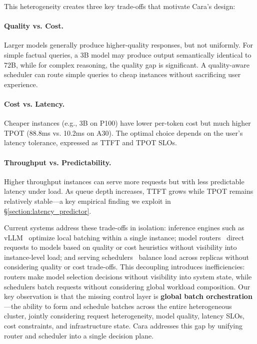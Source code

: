 \documentclass[letterpaper, anonymous, twocolumn, 10pt]{article}
\begin{document}
This heterogeneity creates three key trade-offs that motivate Cara's design:

\paragraph{Quality vs. Cost.}
Larger models generally produce higher-quality responses, but not uniformly.
For simple factual queries, a 3B model may produce output semantically identical to 72B, while for complex reasoning, the quality gap is significant.
A quality-aware scheduler can route simple queries to cheap instances without sacrificing user experience.

\paragraph{Cost vs. Latency.}
Cheaper instances (e.g., 3B on P100) have lower per-token cost but much higher TPOT (88.8ms vs. 10.2ms on A30).
The optimal choice depends on the user's latency tolerance, expressed as TTFT and TPOT SLOs.

\paragraph{Throughput vs. Predictability.}
Higher throughput instances can serve more requests but with less predictable latency under load.
As queue depth increases, TTFT grows while TPOT remains relatively stable---a key empirical finding we exploit in \S\ref{section:latency_predictor}.

Current systems address these trade-offs in isolation: inference engines such as vLLM~\cite{kwon2023vllm} optimize local batching within a single instance; model routers~\cite{Ong2024RouteLLMLT, universal_model_routering} direct requests to models based on quality or cost heuristics without visibility into instance-level load; and serving schedulers~\cite{da2025blockbalancingloadllm, qlm} balance load across replicas without considering quality or cost trade-offs.
This decoupling introduces inefficiencies: routers make model selection decisions without visibility into system state, while schedulers batch requests without considering global workload composition.
Our key observation is that the missing control layer is \textbf{global batch orchestration}---the ability to form and schedule batches across the entire heterogeneous cluster, jointly considering request heterogeneity, model quality, latency SLOs, cost constraints, and infrastructure state.
Cara addresses this gap by unifying router and scheduler into a single decision plane.
\end{document}

